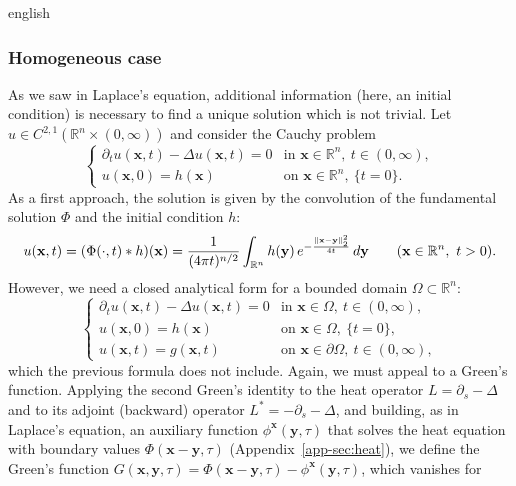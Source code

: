 \begin{hyphenrules}{english}
\subsubsection{Homogeneous case}
As we saw in Laplace's equation, additional information (here, an initial condition) is necessary to
find a unique solution which is not trivial. Let $u\in C^{2,1}(\mathbb{R}^n\times(0,\infty))$ and consider the
Cauchy problem
\begin{equation}
  \begin{cases}
    \partial_t u(\mathbf{x},t)-\Delta u(\mathbf{x},t)=0 & \text{in } \mathbf{x}\in\mathbb{R}^n,\ t\in(0,\infty),\\
    u(\mathbf{x},0)=h(\mathbf{x}) & \text{on } \mathbf{x}\in\mathbb{R}^n,\ \{t=0\}.
  \end{cases}
  \label{eq:heat-cauchy}
\end{equation}
As a first approach, the solution is given by the convolution of the fundamental solution $\Phi$ and
the initial condition $h$:
\begin{equation}
  u(\mathbf{x},t)=(\Phi(\cdot,t)*h)(\mathbf{x})=\frac{1}{(4\pi t)^{n/2}}\int_{\mathbb{R}^n}h(\mathbf{y})\,
  e^{-\frac{\norm{\mathbf{x}-\mathbf{y}}_2^2}{4t}}\,d\mathbf{y}\qquad(\mathbf{x}\in\mathbb{R}^n,\ t>0).
  \label{eq:heat-convolution}
\end{equation}
However, we need a closed analytical form for a bounded domain $\Omega\subset\mathbb{R}^n$:
\begin{equation}
  \begin{cases}
    \partial_t u(\mathbf{x},t)-\Delta u(\mathbf{x},t)=0 & \text{in } \mathbf{x}\in\Omega,\ t\in(0,\infty),\\
    u(\mathbf{x},0)=h(\mathbf{x}) & \text{on } \mathbf{x}\in\Omega,\ \{t=0\},\\
    u(\mathbf{x},t)=g(\mathbf{x},t) & \text{on } \mathbf{x}\in\partial\Omega,\ t\in(0,\infty),
  \end{cases}
  \label{eq:heat-ibvp}
\end{equation}
which the previous formula does not include. Again, we must appeal to a Green's function. Applying the
second Green's identity to the heat operator $L=\partial_s-\Delta$ and to its adjoint (backward) operator
$L^{*}=-\partial_s-\Delta$, and building, as in Laplace's equation, an auxiliary function
$\phi^{\mathbf{x}}(\mathbf{y},\tau)$ that solves the heat equation with boundary values
$\Phi(\mathbf{x}-\mathbf{y},\tau)$ (Appendix~\ref{app-sec:heat}), we define the Green's function
$G(\mathbf{x},\mathbf{y},\tau)=\Phi(\mathbf{x}-\mathbf{y},\tau)-\phi^{\mathbf{x}}(\mathbf{y},\tau)$, which vanishes for

\end{hyphenrules}
